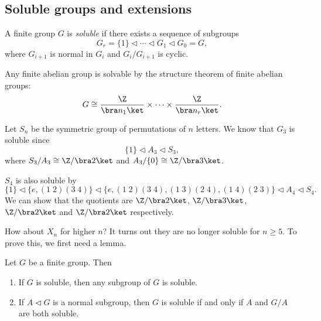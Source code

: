 \documentclass[a4paper]{article}
\begin{document}
\subsection{Soluble groups and extensions}
\begin{defi}
  A finite group $G$ is \emph{soluble} if there exists a sequence of subgroups
  \[
    G_r = \{1\} \lhd \cdots \lhd G_1 \lhd G_0 = G,
  \]
  where $G_{i + 1}$ is normal in $G_i$ and $G_i/G_{i + 1}$ is cyclic.
\end{defi}

\begin{eg}
  Any finite abelian group is solvable by the structure theorem of finite abelian groups:
  \[
    G \cong \frac{\Z}{\bra n_1\ket} \times \cdots \times \frac{\Z}{\bra n_r\ket}.
  \]
\end{eg}

\begin{eg}
  Let $S_n$ be the symmetric group of permutations of $n$ letters. We know that $G_3$ is soluble since
  \[
    \{1\} \lhd A_3 \lhd S_3,
  \]
  where $S_3/A_3 \cong \Z/\bra 2\ket$ and $A_3/\{0\} \cong \Z/\bra 3\ket$.

  $S_4$ is also soluble by
  \[
    \{1\} \lhd \{e, (1\; 2)(3\; 4)\} \lhd \{e, (1\; 2)(3\; 4), (1\; 3)(2\; 4), (1\; 4)(2\; 3)\} \lhd A_4 \lhd S_4.
  \]
  We can show that the quotients are $\Z/\bra 2\ket$, $\Z/\bra 3\ket$, $\Z/\bra 2\ket$ and $\Z/\bra 2\ket$ respectively.
\end{eg}
How about $X_n$ for higher $n$? It turns out they are no longer soluble for $n \geq 5$. To prove this, we first need a lemma.

\begin{lemma}
  Let $G$ be a finite group. Then
  \begin{enumerate}
    \item If $G$ is soluble, then any subgroup of $G$ is soluble.
    \item If $A \lhd G$ is a normal subgroup, then $G$ is soluble if and only if $A$ and $G/A$ are both soluble.
  \end{enumerate}
\end{lemma}
\end{document}

